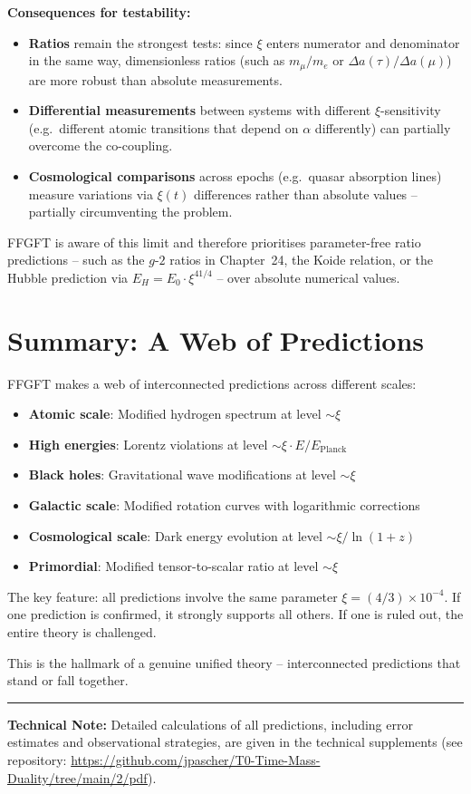 	\textbf{Consequences for testability:}
	\begin{itemize}[leftmargin=*]
		\item \textbf{Ratios} remain the strongest tests: since $\xi$ enters numerator and denominator in the same way, dimensionless ratios (such as $m_\mu/m_e$ or $\Delta a(\tau)/\Delta a(\mu)$) are more robust than absolute measurements.
		\item \textbf{Differential measurements} between systems with different $\xi$-sensitivity (e.g.\ different atomic transitions that depend on $\alpha$ differently) can partially overcome the co-coupling.
		\item \textbf{Cosmological comparisons} across epochs (e.g.\ quasar absorption lines) measure variations via $\xi(t)$ differences rather than absolute values -- partially circumventing the problem.
	\end{itemize}
	
	FFGFT is aware of this limit and therefore prioritises parameter-free ratio predictions -- such as the $g$-$2$ ratios in Chapter~24, the Koide relation, or the Hubble prediction via $E_H = E_0 \cdot \xi^{41/4}$ -- over absolute numerical values.

\section{Summary: A Web of Predictions}

FFGFT makes a web of interconnected predictions across different scales:

\begin{itemize}[leftmargin=*]
\item \textbf{Atomic scale}: Modified hydrogen spectrum at level $\sim \xi$
\item \textbf{High energies}: Lorentz violations at level $\sim \xi \cdot E/E_{\text{Planck}}$
\item \textbf{Black holes}: Gravitational wave modifications at level $\sim \xi$
\item \textbf{Galactic scale}: Modified rotation curves with logarithmic corrections
\item \textbf{Cosmological scale}: Dark energy evolution at level $\sim \xi / \ln(1+z)$
\item \textbf{Primordial}: Modified tensor-to-scalar ratio at level $\sim \xi$
\end{itemize}

The key feature: all predictions involve the same parameter $\xi = (4/3) \times 10^{-4}$. If one prediction is confirmed, it strongly supports all others. If one is ruled out, the entire theory is challenged.

This is the hallmark of a genuine unified theory -- interconnected predictions that stand or fall together.

\vspace{1cm}
\hrule
\vspace{0.5cm}
\noindent\textbf{Technical Note:} Detailed calculations of all predictions, including error estimates and observational strategies, are given in the technical supplements (see repository: \url{https://github.com/jpascher/T0-Time-Mass-Duality/tree/main/2/pdf}).



